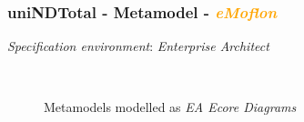 \documentclass{beamer}
\begin{document}
\begin{frame}
\frametitle{uniNDTotal - \textbf{Metamodel} - \textbf{\textit{\textcolor{orange}{eMoflon}}}}

\textit{Specification environment}: \textit{Enterprise Architect}

\begin{figure}[ht]
    \centering
    \mbox{\qquad\qquad
          }
    \caption{Metamodels modelled as \textit{EA Ecore Diagrams}}
    \label{fig:ea-MMS}
\end{figure}

\end{frame}
\end{document}
